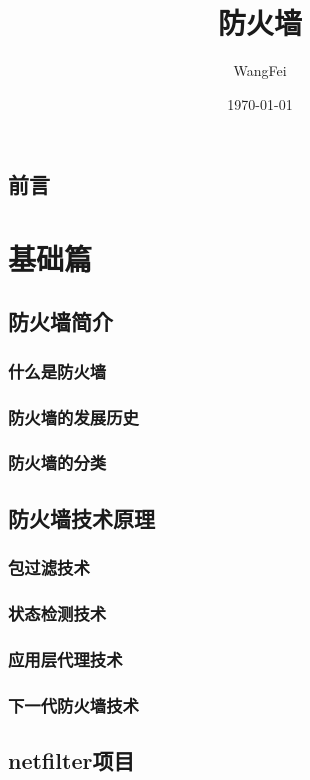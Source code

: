 \documentclass[12pt,UTF8]{ctexbook}
\title{\heiti\zihao{0} 防火墙}
\author{WangFei}
\date{\today}
\begin{document}
\maketitle
\tableofcontents

\frontmatter
\chapter{前言}

\mainmatter

\part{基础篇}
\chapter{防火墙简介}
\section{什么是防火墙}
\section{防火墙的发展历史}
\section{防火墙的分类}

\chapter{防火墙技术原理}
\section{包过滤技术}
\section{状态检测技术}
\section{应用层代理技术}
\section{下一代防火墙技术}

\chapter{netfilter项目}
\end{document}
